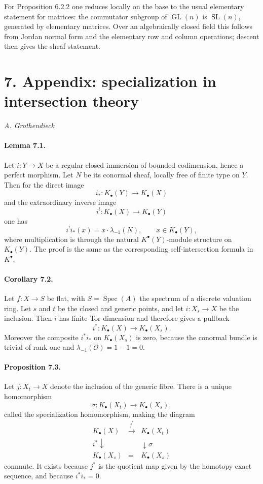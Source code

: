 \documentclass[12pt]{article}
\newcommand{\cO}{\mathcal O}
\newcommand{\Spec}{\operatorname{Spec}}
\newcommand{\Gl}{\operatorname{GL}}
\newcommand{\Sl}{\operatorname{SL}}
\newcommand{\xto}[1]{\xrightarrow{#1}}
\newcommand{\longto}{\longrightarrow}
\begin{document}
For Proposition 6.2.2 one reduces locally on the base to the usual elementary statement for matrices: the commutator subgroup of $\Gl(n)$ is $\Sl(n)$, generated by elementary matrices. Over an algebraically closed field this follows from Jordan normal form and the elementary row and column operations; descent then gives the sheaf statement.

\section*{7. Appendix: specialization in intersection theory}

\begin{flushright}
\emph{A. Grothendieck}
\end{flushright}

\paragraph{Lemma 7.1.}
Let $i:Y\to X$ be a regular closed immersion of bounded codimension, hence a perfect morphism. Let $N$ be its conormal sheaf, locally free of finite type on $Y$. Then for the direct image
\[
i_*:K_\bullet(Y)\longto K_\bullet(X)
\]
and the extraordinary inverse image
\[
i^!:K_\bullet(X)\longto K_\bullet(Y)
\]
one has
\[
i^!i_*(x)=x\cdot \lambda_{-1}(N),\qquad x\in K_\bullet(Y),
\]
where multiplication is through the natural $K^\bullet(Y)$-module structure on $K_\bullet(Y)$. The proof is the same as the corresponding self-intersection formula in $K^\bullet$.

\paragraph{Corollary 7.2.}
Let $f:X\to S$ be flat, with $S=\Spec(A)$ the spectrum of a discrete valuation ring. Let $s$ and $t$ be the closed and generic points, and let $i:X_s\to X$ be the inclusion. Then $i$ has finite Tor-dimension and therefore gives a pullback
\[
i^*:K_\bullet(X)\longto K_\bullet(X_s).
\]
Moreover the composite $i^*i_*$ on $K_\bullet(X_s)$ is zero, because the conormal bundle is trivial of rank one and $\lambda_{-1}(\cO)=1-1=0$.

\paragraph{Proposition 7.3.}
Let $j:X_t\to X$ denote the inclusion of the generic fibre. There is a unique homomorphism
\[
\sigma:K_\bullet(X_t)\longto K_\bullet(X_s),
\]
called the specialization homomorphism, making the diagram
\[
\begin{array}{ccc}
K_\bullet(X)&\xto{\,j^*\,}&K_\bullet(X_t)\\
\scriptstyle i^*\downarrow&&\downarrow\scriptstyle \sigma\\
K_\bullet(X_s)&=&K_\bullet(X_s)
\end{array}
\]
commute. It exists because $j^*$ is the quotient map given by the homotopy exact sequence, and because $i^*i_*=0$.
\end{document}
